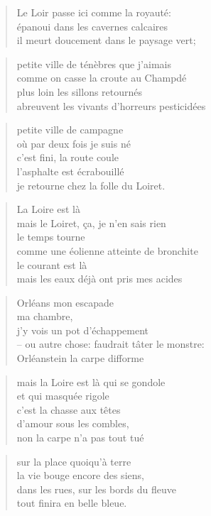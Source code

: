   \begin{verse}
    Le Loir passe ici comme la royauté:\\
    épanoui dans les cavernes calcaires\\
    il meurt doucement dans le paysage vert;
  \end{verse}
  \begin{verse}
    petite ville de ténèbres que j’aimais\\
    comme on casse la croute au Champdé\\
    plus loin les sillons retournés\\
    abreuvent les vivants d’horreurs pesticidées
  \end{verse}
  \begin{verse}
    petite ville de campagne\\
    où par deux fois je suis né\\
    c’est fini, la route coule\\
    l’asphalte est écrabouillé\\
    je retourne chez la folle du Loiret.
  \end{verse}
  \begin{verse}
    La Loire est là\\
    mais le Loiret, ça, je n’en sais rien\\
    le temps tourne\\
    comme une éolienne atteinte de bronchite\\
    le courant est là\\
    mais les eaux déjà ont pris mes acides
  \end{verse}
  \begin{verse}
    Orléans mon escapade\\
    ma chambre,\\
    j’y vois un pot d’échappement\\
    -- ou autre chose: faudrait tâter le monstre:\\
    Orléanstein la carpe difforme
  \end{verse}
  \begin{verse}
    mais la Loire est là qui se gondole\\
    et qui masquée rigole\\
    c’est la chasse aux têtes\\
    d’amour sous les combles,\\
    non la carpe n’a pas tout tué
  \end{verse}
  \begin{verse}
    sur la place quoiqu’à terre\\
    la vie bouge encore des siens,\\
    dans les rues, sur les bords du fleuve\\
    tout finira en belle bleue.
  \end{verse}
